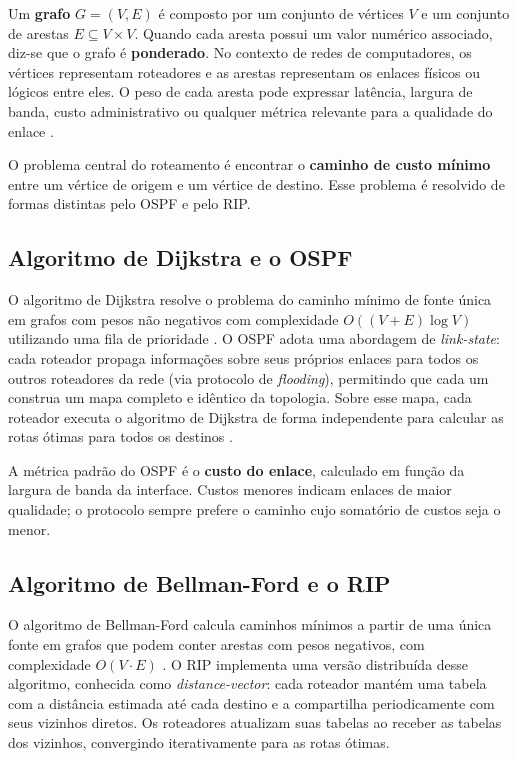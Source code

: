 \documentclass[12pt]{article}
\begin{document}
Um \textbf{grafo} $G = (V, E)$ é composto por um conjunto de vértices $V$ e um
conjunto de arestas $E \subseteq V \times V$. Quando cada aresta possui um valor
numérico associado, diz-se que o grafo é \textbf{ponderado}. No contexto de redes
de computadores, os vértices representam roteadores e as arestas representam os
enlaces físicos ou lógicos entre eles. O peso de cada aresta pode expressar
latência, largura de banda, custo administrativo ou qualquer métrica relevante para
a qualidade do enlace \cite{rfc2328, rfc2453}.

O problema central do roteamento é encontrar o \textbf{caminho de custo mínimo}
entre um vértice de origem e um vértice de destino. Esse problema é resolvido de
formas distintas pelo OSPF e pelo RIP.

\subsection{Algoritmo de Dijkstra e o OSPF}

O algoritmo de Dijkstra resolve o problema do caminho mínimo de fonte única em
grafos com pesos não negativos com complexidade $O((V + E) \log V)$ utilizando uma
fila de prioridade \cite{dijkstra1959}. O OSPF adota uma abordagem de
\textit{link-state}: cada roteador propaga informações sobre seus próprios enlaces
para todos os outros roteadores da rede (via protocolo de \textit{flooding}),
permitindo que cada um construa um mapa completo e idêntico da topologia. Sobre
esse mapa, cada roteador executa o algoritmo de Dijkstra de forma independente para
calcular as rotas ótimas para todos os destinos \cite{rfc2328}.

A métrica padrão do OSPF é o \textbf{custo do enlace}, calculado em função da
largura de banda da interface. Custos menores indicam enlaces de maior qualidade;
o protocolo sempre prefere o caminho cujo somatório de custos seja o menor.

\subsection{Algoritmo de Bellman-Ford e o RIP}

O algoritmo de Bellman-Ford calcula caminhos mínimos a partir de uma única fonte em
grafos que podem conter arestas com pesos negativos, com complexidade $O(V \cdot
E)$ \cite{bellman1958}. O RIP implementa uma versão distribuída desse algoritmo,
conhecida como \textit{distance-vector}: cada roteador mantém uma tabela com a
distância estimada até cada destino e a compartilha periodicamente com seus
vizinhos diretos. Os roteadores atualizam suas tabelas ao receber as tabelas dos
vizinhos, convergindo iterativamente para as rotas ótimas.
\end{document}
